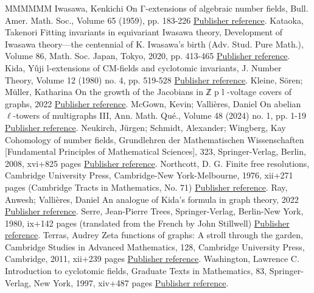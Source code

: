 \documentclass[11pt]{article}
\theoremstyle{definition}
\numberwithin{equation}{section}
\begin{document}
\begin{thebibliography}{MMMMMM}
 Iwasawa, Kenkichi On Γ-extensions of algebraic number fields, Bull. Amer. Math. Soc., Volume 65 (1959), pp. 183-226 \href{https://alco.centre-mersenne.org/articles/10.5802/alco.355/#Iwa59}{Publisher reference}.
 Kataoka, Takenori Fitting invariants in equivariant Iwasawa theory, Development of Iwasawa theory—the centennial of K. Iwasawa’s birth (Adv. Stud. Pure Math.), Volume 86, Math. Soc. Japan, Tokyo, 2020, pp. 413-465 \href{https://alco.centre-mersenne.org/articles/10.5802/alco.355/#Kata_05}{Publisher reference}.
 Kida, Yûji l-extensions of CM-fields and cyclotomic invariants, J. Number Theory, Volume 12 (1980) no. 4, pp. 519-528 \href{https://alco.centre-mersenne.org/articles/10.5802/alco.355/#Kid80}{Publisher reference}.
 Kleine, Sören; Müller, Katharina On the growth of the Jacobians in ℤ p l -voltage covers of graphs, 2022 \href{https://alco.centre-mersenne.org/articles/10.5802/alco.355/#KM22}{Publisher reference}.
 McGown, Kevin; Vallières, Daniel On abelian \(\ell\)-towers of multigraphs III, Ann. Math. Qué., Volume 48 (2024) no. 1, pp. 1-19 \href{https://alco.centre-mersenne.org/articles/10.5802/alco.355/#MV21b}{Publisher reference}.
 Neukirch, Jürgen; Schmidt, Alexander; Wingberg, Kay Cohomology of number fields, Grundlehren der Mathematischen Wissenschaften [Fundamental Principles of Mathematical Sciences], 323, Springer-Verlag, Berlin, 2008, xvi+825 pages \href{https://alco.centre-mersenne.org/articles/10.5802/alco.355/#NSW08}{Publisher reference}.
 Northcott, D. G. Finite free resolutions, Cambridge University Press, Cambridge-New York-Melbourne, 1976, xii+271 pages (Cambridge Tracts in Mathematics, No. 71) \href{https://alco.centre-mersenne.org/articles/10.5802/alco.355/#Nor76}{Publisher reference}.
 Ray, Anwesh; Vallières, Daniel An analogue of Kida’s formula in graph theory, 2022 \href{https://alco.centre-mersenne.org/articles/10.5802/alco.355/#RV22}{Publisher reference}.
 Serre, Jean-Pierre Trees, Springer-Verlag, Berlin-New York, 1980, ix+142 pages (translated from the French by John Stillwell) \href{https://alco.centre-mersenne.org/articles/10.5802/alco.355/#Ser80}{Publisher reference}.
 Terras, Audrey Zeta functions of graphs: A stroll through the garden, Cambridge Studies in Advanced Mathematics, 128, Cambridge University Press, Cambridge, 2011, xii+239 pages \href{https://alco.centre-mersenne.org/articles/10.5802/alco.355/#Ter11}{Publisher reference}.
 Washington, Lawrence C. Introduction to cyclotomic fields, Graduate Texts in Mathematics, 83, Springer-Verlag, New York, 1997, xiv+487 pages \href{https://alco.centre-mersenne.org/articles/10.5802/alco.355/#Was97}{Publisher reference}.
\end{thebibliography}
\end{document}
